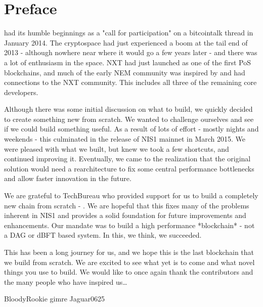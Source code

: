 \section*{Preface}


 had its humble beginnings as a "call for participation" on a bitcointalk thread in January 2014.
The cryptospace had just experienced a boom at the tail end of 2013 - although nowhere near where it would go a few years later - and there was a lot of enthusiasm in the space.
NXT had just launched as one of the first PoS blockchains, and much of the early NEM community was inspired by and had connections to the NXT community. This includes all three of the remaining core developers.

Although there was some initial discussion on what to build, we quickly decided to create something new from scratch.
We wanted to challenge ourselves and see if we could build something useful.
As a result of lots of effort - mostly nights and weekends - this culminated in the release of NIS1 mainnet in March 2015.
We were pleased with what we built, but knew we took a few shortcuts, and continued improving it.
Eventually, we came to the realization that the original solution would need a rearchitecture to fix some central performance bottlenecks and allow faster innovation in the future.

We are grateful to TechBureau who provided support for us to build a completely new chain from scratch - \codename.
We are hopeful that this fixes many of the problems inherent in NIS1 and provides a solid foundation for future improvements and enhancements.
Our mandate was to build a high performance *blockchain* - not a DAG or dBFT based system.
In this, we think, we succeeded.

This has been a long journey for us, and we hope this is the last blockchain that we build from scratch.
We are excited to see what yet is to come and what novel things you use \codenamespace to build.
We would like to once again thank the contributors and the many people who have inspired us\ldots

\begin{flushright}
BloodyRookie
gimre
Jaguar0625
\end{flushright}
